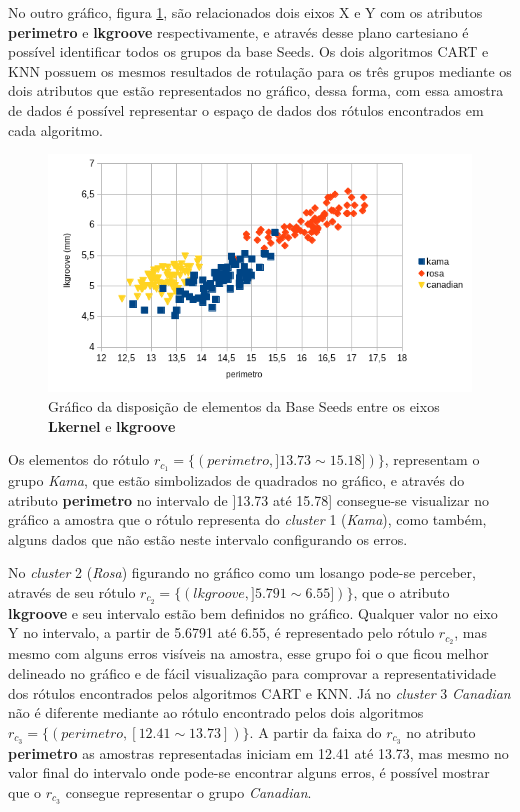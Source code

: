 No outro gráfico, figura \ref{fig:grafico_CART_KNN_SEEDS_perimetro_lkgroove}, são relacionados dois eixos X e Y com os atributos \textbf{perimetro} e \textbf{lkgroove} respectivamente, e através desse plano cartesiano é possível identificar todos os grupos da base Seeds. Os dois algoritmos   CART e KNN possuem os mesmos resultados de rotulação para os três grupos mediante os dois atributos que estão representados no gráfico, dessa forma, com essa amostra de dados é possível representar o espaço de dados dos rótulos encontrados em cada algoritmo.

\begin{figure}[h!]
        \centering
        \includegraphics[scale=0.9]{figs/grafico_CART_KNN_SEEDS_perimetro_lkgroove.png}
        \caption{Gráfico da disposição de elementos da Base Seeds entre os eixos \textbf{Lkernel} e \textbf{lkgroove}} \label{fig:grafico_CART_KNN_SEEDS_perimetro_lkgroove}
\end{figure}

Os elementos do rótulo ${r_{c_1}=\{ (perimetro, ]13.73 \sim 15.18]) \} }$,  representam o grupo \textit{Kama}, que estão simbolizados de quadrados no gráfico, e através do atributo \textbf{perimetro} no intervalo de ]13.73 até 15.78] consegue-se visualizar no gráfico a amostra que o rótulo representa do \textit{cluster} 1 (\textit{Kama}), como também, alguns dados que não estão neste intervalo configurando os erros.

No \textit{cluster} 2 (\textit{Rosa}) figurando no gráfico como um losango pode-se perceber, através de seu rótulo ${r_{c_2}=\{ (lkgroove, ] 5.791 \sim  6.55]) \} }$, que o atributo \textbf{lkgroove} e seu intervalo estão bem definidos no gráfico. Qualquer valor no eixo Y no intervalo, a partir de 5.6791 até 6.55, é representado pelo rótulo ${r_{c_2}}$, mas mesmo com alguns erros visíveis na amostra, esse grupo foi o que ficou melhor delineado no gráfico e de fácil visualização para comprovar a representatividade dos rótulos encontrados pelos algoritmos CART e KNN. Já no \textit{cluster} 3 \textit{Canadian} não é diferente mediante ao rótulo encontrado pelos dois algoritmos ${r_{c_3}=\{ (perimetro, [12.41 \sim  13.73])\} }$. A partir da faixa do  ${r_{c_3}}$ no atributo \textbf{perimetro} as amostras representadas iniciam em 12.41 até 13.73,  mas mesmo no valor final do intervalo onde pode-se encontrar alguns erros, é possível mostrar que o ${r_{c_3}}$ consegue representar o grupo \textit{Canadian}.

